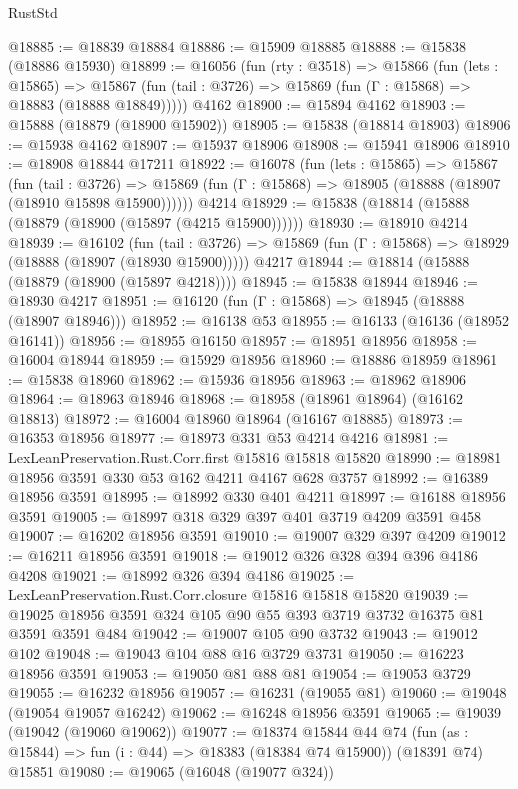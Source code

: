 \begin{lexlean}{RustStd}
\begin{coremodule}
@18885 := @18839 @18884
@18886 := @15909 @18885
@18888 := @15838 (@18886 @15930)
@18899 := @16056
    (fun (rty : @3518) =>
    @15866
      (fun (lets : @15865) =>
      @15867 (fun (tail : @3726) => @15869 (fun (Γ : @15868) => @18883 (@18888 @18849)))))
    @4162
@18900 := @15894 @4162
@18903 := @15888 (@18879 (@18900 @15902))
@18905 := @15838 (@18814 @18903)
@18906 := @15938 @4162
@18907 := @15937 @18906
@18908 := @15941 @18906
@18910 := @18908 @18844 @17211
@18922 := @16078
    (fun (lets : @15865) =>
    @15867
      (fun (tail : @3726) =>
      @15869 (fun (Γ : @15868) => @18905 (@18888 (@18907 (@18910 @15898 @15900))))))
    @4214
@18929 := @15838 (@18814 (@15888 (@18879 (@18900 (@15897 (@4215 @15900))))))
@18930 := @18910 @4214
@18939 := @16102
    (fun (tail : @3726) => @15869 (fun (Γ : @15868) => @18929 (@18888 (@18907 (@18930 @15900)))))
    @4217
@18944 := @18814 (@15888 (@18879 (@18900 (@15897 @4218))))
@18945 := @15838 @18944
@18946 := @18930 @4217
@18951 := @16120 (fun (Γ : @15868) => @18945 (@18888 (@18907 @18946)))
@18952 := @16138 @53
@18955 := @16133 (@16136 (@18952 @16141))
@18956 := @18955 @16150
@18957 := @18951 @18956
@18958 := @16004 @18944
@18959 := @15929 @18956
@18960 := @18886 @18959
@18961 := @15838 @18960
@18962 := @15936 @18956
@18963 := @18962 @18906
@18964 := @18963 @18946
@18968 := @18958 (@18961 @18964) (@16162 @18813)
@18972 := @16004 @18960 @18964 (@16167 @18885)
@18973 := @16353 @18956
@18977 := @18973 @331 @53 @4214 @4216
@18981 := LexLeanPreservation.Rust.Corr.first @15816 @15818 @15820
@18990 := @18981 @18956 @3591 @330 @53 @162 @4211 @4167 @628 @3757
@18992 := @16389 @18956 @3591
@18995 := @18992 @330 @401 @4211
@18997 := @16188 @18956 @3591
@19005 := @18997 @318 @329 @397 @401 @3719 @4209 @3591 @458
@19007 := @16202 @18956 @3591
@19010 := @19007 @329 @397 @4209
@19012 := @16211 @18956 @3591
@19018 := @19012 @326 @328 @394 @396 @4186 @4208
@19021 := @18992 @326 @394 @4186
@19025 := LexLeanPreservation.Rust.Corr.closure @15816 @15818 @15820
@19039 := @19025 @18956 @3591 @324 @105 @90 @55 @393 @3719 @3732 @16375 @81 @3591 @3591 @484
@19042 := @19007 @105 @90 @3732
@19043 := @19012 @102
@19048 := @19043 @104 @88 @16 @3729 @3731
@19050 := @16223 @18956 @3591
@19053 := @19050 @81 @88 @81
@19054 := @19053 @3729
@19055 := @16232 @18956
@19057 := @16231 (@19055 @81)
@19060 := @19048 (@19054 @19057 @16242)
@19062 := @16248 @18956 @3591
@19065 := @19039 (@19042 (@19060 @19062))
@19077 := @18374
    @15844
    @44
    @74
    (fun (as : @15844) => fun (i : @44) => @18383 (@18384 @74 @15900))
    (@18391 @74)
    @15851
@19080 := @19065 (@16048 (@19077 @324))

\end{coremodule}
\end{lexlean}
